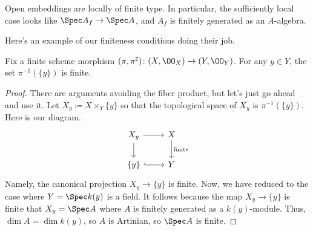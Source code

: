 \documentclass[../notes.tex]{subfiles}
\begin{document}
\begin{remark}
	Open embeddings are locally of finite type. In particular, the sufficiently local case looks like $\Spec A_f\to\Spec A$, and $A_f$ is finitely generated as an $A$-algebra.
\end{remark}
Here's an example of our finiteness conditions doing their job.
\begin{lemma}
	Fix a finite scheme morphism $(\pi,\pi^\sharp)\colon (X,\OO_X)\to (Y,\OO_Y)$. For any $y\in Y$, the set $\pi^{-1}(\{y\})$ is finite.
\end{lemma}
\begin{proof}
	There are arguments avoiding the fiber product, but let's just go ahead and use it. Let $X_y\coloneqq X\times_Y\{y\}$ so that the topological space of $X_y$ is $\pi^{-1}(\{y\})$. Here is our diagram.
	\[\begin{tikzcd}
		{X_y} & X \\
		{\{y\}} & Y
		\arrow[from=1-1, to=1-2]
		\arrow["{\text{finite}}", from=1-2, to=2-2]
		\arrow[hook, from=2-1, to=2-2]
		\arrow[from=1-1, to=2-1]
	\end{tikzcd}\]
	Namely, the canonical projection $X_y\to\{y\}$ is finite. Now, we have reduced to the case where $Y=\Spec k(y)$ is a field. It follows because the map $X_y\to\{y\}$ is finite that $X_y=\Spec A$ where $A$ is finitely generated as a $k(y)$-module. Thus, $\dim A=\dim k(y)$, so $A$ is Artinian, so $\Spec A$ is finite.
\end{proof}
\end{document}
